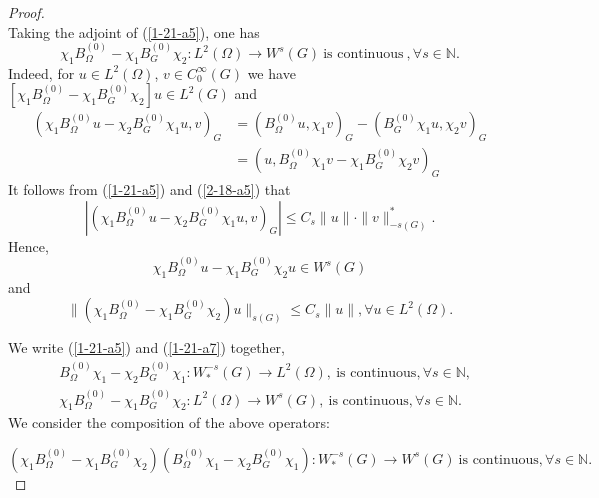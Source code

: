 \documentclass[a4paper,centertags,oneside,12pt]{amsart}
\numberwithin{equation}{section}
\begin{document}
\begin{proof}
\begin{equation}
\end{equation}
Taking the adjoint of (\ref{1-21-a5}), one has
\begin{equation}\label{1-21-a7}
    \chi_1 B_\Omega^{(0)}-\chi_1 B_G^{(0)}\chi_2: L^2(\Omega)\rightarrow  W^s(G)~\text{is continuous}~, \forall s\in\mathbb N.
\end{equation}
Indeed, for $u\in L^2(\Omega)$, $v\in C_0^\infty(G)$ we have $[\chi_1 B_\Omega^{(0)}-\chi_1 B_G^{(0)}\chi_2] u\in L^2(G)$ and 
\begin{equation}\label{2-18-a5}
\begin{split}
    (\chi_1 B_\Omega^{(0)}u-\chi_2 B_G^{(0)}\chi_1 u, v)_G
    &=(B_\Omega^{(0)}u, \chi_1 v)_G-(B_G^{(0)}\chi_1 u, \chi_2 v)_G\\
    &=(u, B_\Omega^{(0)}\chi_1 v-\chi_1 B_G^{(0)}\chi_2 v)_G
    \end{split}
\end{equation}
It follows from (\ref{1-21-a5}) and (\ref{2-18-a5}) that 
\begin{equation*}
    |(\chi_1 B_\Omega^{(0)}u-\chi_2 B_G^{(0)}\chi_1 u, v)_G|\leq C_s\|u\|\cdot\|v\|_{-s(G)}^\ast.
\end{equation*}
Hence, $$\chi_1 B_\Omega^{(0)}u-\chi_1 B_G^{(0)}\chi_2 u\in W^s(G)$$ and 
\begin{equation*}
    \|(\chi_1 B_\Omega^{(0)}-\chi_1 B_G^{(0)}\chi_2 )u\|_{s(G)}\leq C_s\|u\|, \forall u\in L^2(\Omega).
\end{equation*}

We write (\ref{1-21-a5}) and (\ref{1-21-a7}) together,
\begin{equation*}
\begin{split}
    &B_\Omega^{(0)}\chi_1- \chi_2B_{G}^{(0)}\chi_1: W_\ast^{-s}(G)\rightarrow L^2(\Omega), ~\text{is continuous}, \forall s\in\mathbb N,\\
    &\chi_1 B_\Omega^{(0)}-\chi_1 B_{G}^{(0)}\chi_2: L^2(\Omega)\rightarrow W^s(G), ~\text{is continuous}, \forall s\in\mathbb N.
    \end{split}
\end{equation*}
We consider the composition of the above operators:

\begin{equation}\label{1-21-b10}
    (\chi_1 B_\Omega^{(0)}-\chi_1 B_{G}^{(0)}\chi_2)(B_\Omega^{(0)}\chi_1-\chi_2 B_{G}^{(0)}\chi_1): W_\ast^{-s}(G)\rightarrow W^s(G)~\text{is continuous}, \forall s\in\mathbb N.
\end{equation}



\end{proof}
\end{document}
